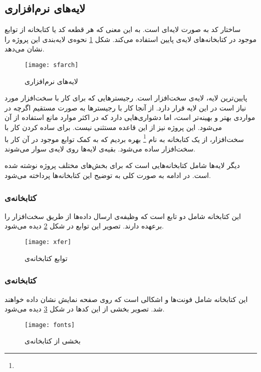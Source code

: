 \subsection{لایه‌های نرم‌افزاری}
ساختار کد به صورت لایه‌ای است. به این معنی که هر قطعه کد یا کتابخانه از توابع موجود در کتابخانه‌های لایه‌ی پایین استفاده می‌کند. شکل \ref{fig:sfarch} نحوه‌ی لایه‌بندی این پروژه را نشان می‌دهد.
\begin{figure}[h]
	\centering
	\texttt{[image: sfarch]}
	\caption{لایه‌های نرم‌افزاری}
	\label{fig:sfarch}
\end{figure}

پایین‌ترین لایه، لایه‌ی سخت‌افزار است. رجیسترهایی که برای کار با سخت‌افزار مورد نیاز است در این لایه قرار دارد. از آنجا کار با رجیسترها به صورت مستقیم اگرچه در مواردی بهتر و بهینه‌تر است، اما دشواری‌هایی دارد که در اکثر موارد مانع استفاده از آن می‌شود. این پروژه نیز از این قاعده مستثنی نیست. برای ساده کردن کار با سخت‌افزار، از یک کتابخانه به نام
\footnote{}
بهره بردیم که به کمک توابع موجود در آن کار با سخت‌افزار ساده می‌شود. بقیه‌ی لایه‌ها روی لایه‌ی  سوار می‌شوند.

دیگر لایه‌ها شامل کتابخانه‌هایی است که برای بخش‌های مختلف پروژه نوشته شده است. در ادامه به صورت کلی به توضیح این کتابخانه‌ها پرداخته می‌شود.

\subsubsection{کتابخانه‌ی }
این کتابخانه شامل دو تابع است که وظیفه‌ی ارسال داده‌ها از طریق سخت‌افزار را برعهده دارند. تصویر این توابع در شکل \ref{fig:xfer} دیده می‌شود.

\begin{figure}[h]
	\centering
	\texttt{[image: xfer]}
	\caption{توابع کتابخانه‌ی }
	\label{fig:xfer}
\end{figure}

\subsubsection{کتابخانه‌ی }
این کتابخانه شامل فونت‌ها و اشکالی است که روی صفحه نمایش نشان داده خواهند شد. تصویر بخشی از این کدها در شکل \ref{fig:fonts} دیده می‌شود.

\begin{figure}[h]
	\centering
	\texttt{[image: fonts]}
	\caption{بخشی از کتابخانه‌ی }
	\label{fig:fonts}
\end{figure}

